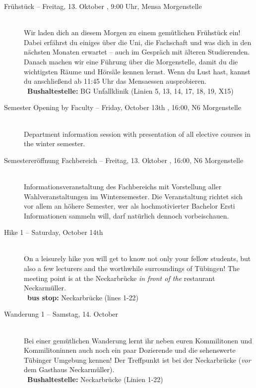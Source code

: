 \begin{description}
\ifbachelor \pagebreak  \fi

\ifbachelor
 	\item[Frühstück -- Freitag, 13. Oktober \YEAR, 9:00 Uhr, Mensa Morgenstelle]\ \\
 	Wir laden dich an diesem Morgen zu einem gemütlichen Frühstück ein! Dabei erfährst du einiges über die Uni, die Fachschaft und was dich in den nächsten Monaten erwartet -- auch im Gespräch mit älteren Studierenden.
 	Danach machen wir eine Führung über die Morgenstelle, damit du die wichtigsten Räume und Hörsäle kennen lernst.
 	Wenn du Lust hast, kannst du anschließend ab 11:45 Uhr das Mensaessen ausprobieren.\\
 	~\textbf{Bushaltestelle:} BG Unfallklinik (Linien 5, 13, 14, 17, 18, 19, X15)
\fi

\ifml
	\item[Semester Opening by Faculty -- Friday, October 13th \YEAR, 16:00, N6 Morgenstelle]\ \\
	Department information session with presentation of all elective courses in the winter semester.
\else
	\item[Semestereröffnung Fachbereich -- Freitag, 13. Oktober \YEAR, 16:00, N6 Morgenstelle]\ \\
	Informationsveranstaltung des Fachbereichs mit Vorstellung aller
	Wahlveranstaltungen im Wintersemester. 
	Die Veranstaltung richtet sich vor allem an höhere Semester, 
	wer als hochmotivierter Bachelor Ersti Informationen sammeln will, darf natürlich dennoch vorbeischauen.
\fi

\ifml
	\item[Hike 1 -- Saturday, October 14th \YEAR]~\\%
	On a leisurely hike you will get to know not only your fellow students,
	but also a few lecturers and the worthwhile surroundings of Tübingen!
	The meeting point is at the Neckarbrücke \emph{in front of the} restaurant \glqq Neckarmüller\grqq. \\
	~\textbf{bus stop:} Neckarbrücke (lines 1-22)
\else
	\item[Wanderung 1 -- Samstag, 14. October \YEAR]~\\%
	Bei einer gemütlichen Wanderung lernt ihr neben euren Kommilitonen und Kommilitoninnen auch
	noch ein paar Dozierende und die sehenswerte Tübinger Umgebung kennen!
	Der Treffpunkt ist bei der Neckarbrücke (\emph{vor} dem Gasthaus \glqq Neckarmüller\grqq).\\
	~\textbf{Bushaltestelle:} Neckarbrücke (Linien 1-22)
\fi


\end{description}
